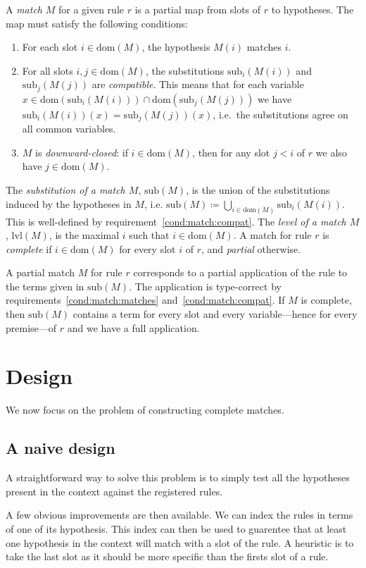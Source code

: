 \documentclass[runningheads]{llncs}
\newcommand{\dom}{\ensuremath{\mathrm{dom}}}
\newcommand{\sub}{\ensuremath{\mathrm{sub}}}
\newcommand{\lvl}{\ensuremath{\mathrm{lvl}}}
\begin{document}
A \textit{match} $M$ for a given rule $r$ is a partial map from slots of $r$ to hypotheses.
The map must satisfy the following conditions:
\begin{enumerate}
  \item\label{cond:match:matches} For each slot $i ∈ \dom(M)$, the hypothesis $M(i)$ matches $i$.
  \item\label{cond:match:compat} For all slots $i,j ∈ \dom(M)$, the substitutions $\sub_{i}(M(i))$ and $\sub_{j}(M(j))$ are \emph{compatible}.
        This means that for each variable $x ∈ \dom(\sub_{i}(M(i))) ∩ \dom(\sub_{j}(M(j)))$ we have $\sub_{i}(M(i))(x) = \sub_{j}(M(j))(x)$, i.e.\ the substitutions agree on all common variables.
  \item\label{cond:match:closed} $M$ is \emph{downward-closed}: if $i ∈ \dom(M)$, then for any slot $j < i$ of $r$ we also have $j ∈ \dom(M)$.
\end{enumerate}
The \emph{substitution of a match $M$}, $\sub(M)$, is the union of the substitutions induced by the hypotheses in $M$, i.e. $\sub(M) ≔ ⋃_{i ∈ \dom(M)}\sub_{i}(M(i))$.
This is well-defined by requirement~\ref{cond:match:compat}.
The \textit{level of a match $M$}, $\lvl(M)$, is the maximal $i$ such that $i ∈ \dom(M)$.
A match for rule $r$ is \textit{complete} if $i ∈ \dom(M)$ for every slot $i$ of $r$, and \emph{partial} otherwise.

A partial match $M$ for rule $r$ corresponds to a partial application of the rule to the terms given in $\sub(M)$.
The application is type-correct by requirements~\ref{cond:match:matches} and~\ref{cond:match:compat}.
If $M$ is complete, then $\sub(M)$ contains a term for every slot and every variable---hence for every premise---of $r$ and we have a full application.

\section{Design}

We now focus on the problem of constructing complete matches.

\subsection{A naive design}

A straightforward way to solve this problem is to simply test all the hypotheses present in the context against the registered rules.

A few obvious improvements are then available.
We can index the rules in terms of one of its hypothesis.
This index can then be used to guarentee that at least one hypothesis in the context will match with a slot of the rule.
A heuristic is to take the last slot as it should be more specific than the firsts slot of a rule.
\end{document}
